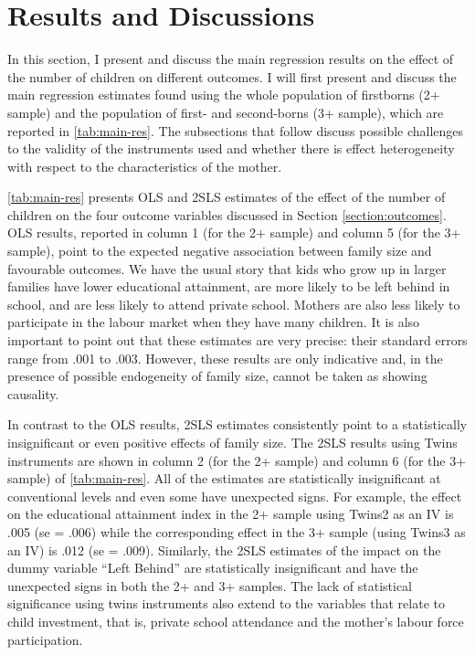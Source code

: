 
\section{Results and Discussions}
\label{section:results}

In this section, I present and discuss the main regression results on the effect of the number of children on different outcomes. I will first present and discuss the main regression estimates found using the whole population of firstborns (2+ sample) and the population of first- and second-borns (3+ sample), which are reported in \autoref{tab:main-res}. The subsections that follow discuss possible challenges to the validity of the instruments used and whether there is effect heterogeneity with respect to the characteristics of the mother.



\autoref{tab:main-res} presents OLS and 2SLS estimates of the effect of the number of children on the four outcome variables discussed in Section \ref{section:outcomes}. OLS results, reported in column 1 (for the 2+ sample) and column 5 (for the 3+ sample), point to the expected negative association between family size and favourable outcomes. We have the usual story that kids who grow up in larger families have lower educational attainment, are more likely to be left behind in school, and are less likely to attend private school. Mothers are also less likely to participate in the labour market when they have many children. It is also important to point out that these estimates are very precise: their standard errors range from .001 to .003. However, these results are only indicative and, in the presence of possible endogeneity of family size, cannot be taken as showing causality.

In contrast to the OLS results, 2SLS estimates consistently point to a statistically insignificant or even positive effects of family size. The 2SLS results using Twins instruments are shown in column 2 (for the 2+ sample) and column 6 (for the 3+ sample) of \autoref{tab:main-res}. All of the estimates are statistically insignificant at conventional levels and even some have unexpected signs. For example, the effect on the educational attainment index in the 2+ sample using Twins2 as an IV is .005 (se = .006) while the corresponding effect in the 3+ sample (using Twins3 as an IV) is .012 (se = .009). Similarly, the 2SLS estimates of the impact on the dummy variable \enquote{Left Behind} are statistically insignificant and have the unexpected signs in both the 2+ and 3+ samples. The lack of statistical significance using twins instruments also extend to the variables that relate to child investment, that is, private school attendance and the mother's labour force participation. 


